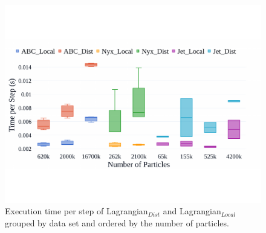 \begin{figure}[!t]
\centering
\includegraphics[width=\linewidth, trim={0.45cm 3.5cm 2cm 4.5cm}, clip]{Images/dataset_timings4.pdf}
\caption{Execution time per step of Lagrangian$_{Dist}$ and Lagrangian$_{Local}$ grouped by data set and ordered by the number of particles.}
\label{fig:dataset_timings}
\end{figure}
